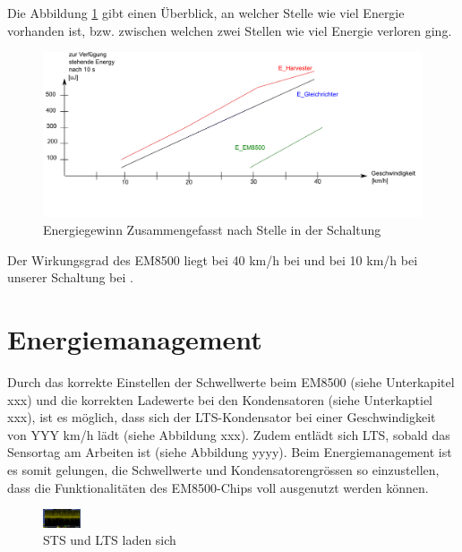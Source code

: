 Die Abbildung \ref{zsmEnergyGewinn} gibt einen Überblick, an welcher Stelle wie viel Energie vorhanden ist, bzw. zwischen welchen zwei Stellen wie viel Energie verloren ging.

\begin{figure}
    \includegraphics[width=1\textwidth]{4Resultate/imag/EnergyGewinnNachStelle.png} 
    \caption{Energiegewinn Zusammengefasst nach Stelle in der Schaltung}
    \label{zsmEnergyGewinn}
\end{figure}

Der Wirkungsgrad des EM8500 liegt bei 40 km/h  bei  und bei 10 km/h bei unserer Schaltung bei .





\section{Energiemanagement}


Durch das korrekte Einstellen der Schwellwerte beim EM8500 (siehe Unterkapitel xxx) und die korrekten Ladewerte bei den Kondensatoren (siehe Unterkaptiel xxx), ist es möglich, dass sich der LTS-Kondensator bei einer Geschwindigkeit von YYY km/h lädt (siehe Abbildung xxx). Zudem entlädt sich LTS, sobald das Sensortag am Arbeiten ist (siehe Abbildung yyyy). Beim Energiemanagement ist es somit gelungen, die Schwellwerte und Kondensatorengrössen so einzustellen, dass die Funktionalitäten des EM8500-Chips voll ausgenutzt werden können.

\begin{figure}[ht]
    \includegraphics[width=0.1\textwidth]{4Resultate/imag/SpannungVCC.png} 
    \caption{STS und LTS laden sich}
\end{figure}

